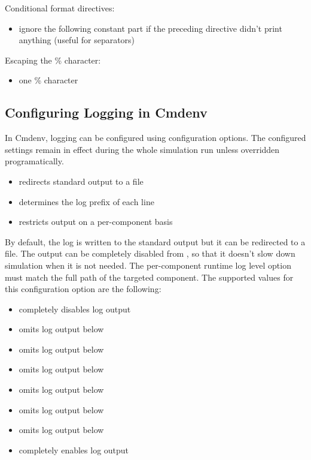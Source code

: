 Conditional format directives:
\begin{itemize}
  \item {} ignore the following constant part if the preceding directive didn't print anything (useful for separators)
\end{itemize}

Escaping the \% character:
\begin{itemize}
  \item \ttt{\%\%} one \% character
\end{itemize}

\subsection{Configuring Logging in Cmdenv}
\label{sec:config-sim:configuring-logging-in-cmdenv}

In Cmdenv, logging can be configured using  configuration
options. The configured settings remain in effect during the whole simulation run
unless overridden programatically.

\begin{itemize}
  \item {} redirects standard output to a file
  \item {} determines the log prefix of each line
  \item {} restricts output on a per-component basis
\end{itemize}

By default, the log is written to the standard output but it can be redirected to
a file. The output can be completely disabled from , so
that it doesn't slow down simulation when it is not needed. The per-component
runtime log level option must match the full path of the targeted component. The
supported values for this configuration option are the following:

\begin{itemize}
  \item {} completely disables log output
  \item {} omits log output below 
  \item {} omits log output below 
  \item {} omits log output below 
  \item {} omits log output below 
  \item {} omits log output below 
  \item {} omits log output below 
  \item {} completely enables log output
\end{itemize}

